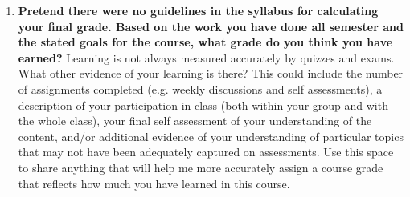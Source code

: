\documentclass{article}
\begin{document}
\begin{enumerate}
\item \textbf{Pretend there were no guidelines in the syllabus for calculating your final grade. Based on the work you have done all semester and the stated goals for the course, what grade do you think you have earned?} Learning is not always measured accurately by quizzes and exams. What other evidence of your learning is there? This could include the number of assignments completed (e.g. weekly discussions and self assessments), a description of your participation in class (both within your group and with the whole class), your final self assessment of your understanding of the content, and/or additional evidence of your understanding of particular topics that may not have been adequately captured on assessments. Use this space to share anything that will help me more accurately assign a course grade that reflects how much you have learned in this course.
\end{enumerate}
\end{document}
